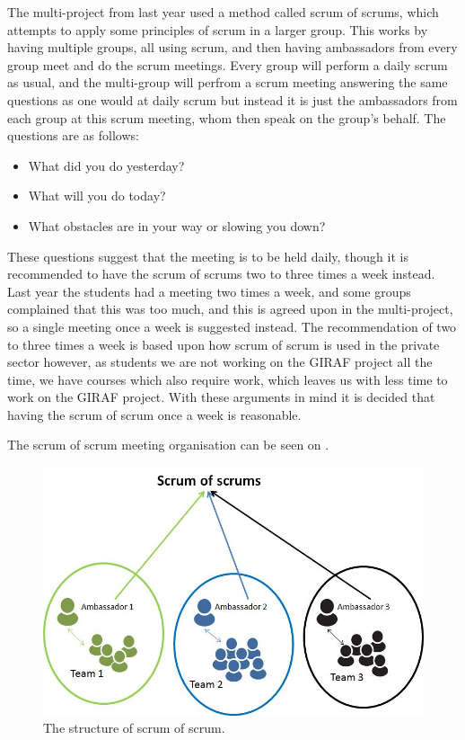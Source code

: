 \bigskip
The multi-project from last year used a method called scrum of scrums, which attempts to apply some principles of scrum in a larger group.
This works by having multiple groups, all using scrum, and then having ambassadors from every group meet and do the scrum meetings. 
Every group will perform a daily scrum as usual, and the multi-group will perfrom a scrum meeting answering the same questions as one would at daily scrum but instead it is just the ambassadors from each group at this scrum meeting, whom then speak on the group's behalf.
The questions are as follows:

\begin{itemize}
	\item What did you do yesterday? 
	\item What will you do today?
	\item What obstacles are in your way or slowing you down?
\end{itemize}

These questions suggest that the meeting is to be held daily, though it is recommended to have the scrum of scrums two to three times a week instead. 
Last year the students had a meeting two times a week, and some groups complained that this was too much, and this is agreed upon in the multi-project, so a single meeting once a week is suggested instead.
The recommendation of two to three times a week is based upon how scrum of scrum is used in the private sector however, as students we are not working on the GIRAF project all the time, we have courses which also require work, which leaves us with less time to work on the GIRAF project. 
With these arguments in mind it is decided that having the scrum of scrum once a week is reasonable.

The scrum of scrum meeting organisation can be seen on .

\begin{figure}
\centering
\includegraphics[scale=0.4]{figures/scrumofscrum.png}
\caption{The structure of scrum of scrum.}
\label{fig:scrumofscrum}
\end{figure}

